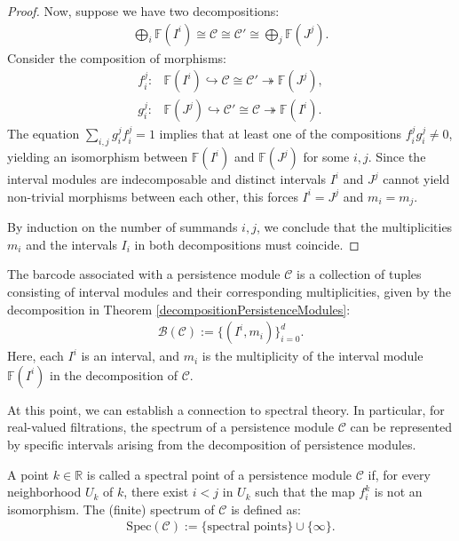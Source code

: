 \begin{proof}
Now, suppose we have two decompositions:
\begin{align}
	\bigoplus_i \mathbb{F}(I^i) \cong \mathcal{C} \cong \mathcal{C}' \cong \bigoplus_j \mathbb{F}(J^j).
\end{align}
Consider the composition of morphisms:
\begin{align}
	f_{i}^j: &\mathbb{F}(I^i) \hookrightarrow \mathcal{C} \cong \mathcal{C}' \twoheadrightarrow \mathbb{F}(J^j),\\
	g_{i}^j: &\mathbb{F}(J^j) \hookrightarrow \mathcal{C}' \cong \mathcal{C} \twoheadrightarrow \mathbb{F}(I^i).
\end{align}
The equation $\sum_{i,j} g_{i}^jf_{i}^j = 1$ implies that at least one of the compositions $f_{i}^jg_{i}^j \neq 0$, yielding an isomorphism between $\mathbb{F}(I^i)$ and $\mathbb{F}(J^j)$ for some $i, j$. Since the interval modules are indecomposable and distinct intervals $I^i$ and $J^j$ cannot yield non-trivial morphisms between each other, this forces $I^i = J^j$ and $m_i = m_j$. 

By induction on the number of summands $i,j$, we conclude that the multiplicities $m_i$ and the intervals $I_i$ in both decompositions must coincide.
\end{proof}

\begin{definition}
The barcode associated with a persistence module $\mathcal{C}$ is a collection of tuples consisting of interval modules and their corresponding multiplicities, given by the decomposition in Theorem \ref{decompositionPersistenceModules}:
\begin{align}
	\mathcal{B}(\mathcal{C}) := \{(I^i, m_i)\}_{i=0}^d.
\end{align}
Here, each $I^i$ is an interval, and $m_i$ is the multiplicity of the interval module $\mathbb{F}(I^i)$ in the decomposition of $\mathcal{C}$.
\end{definition}

At this point, we can establish a connection to spectral theory. In particular, for real-valued filtrations, the spectrum of a persistence module $\mathcal{C}$ can be represented by specific intervals arising from the decomposition of persistence modules.

\begin{definition}[Spectrum]
A point $k \in \mathbb{R}$ is called a spectral point of a persistence module $\mathcal{C}$ if, for every neighborhood $U_k$ of $k$, there exist $i < j$ in $U_k$ such that the map $f_{i}^k$ is not an isomorphism. The (finite) spectrum of $\mathcal{C}$ is defined as:
\begin{align}
	\text{Spec}(\mathcal{C}) := \{ \text{spectral points} \} \cup \{\infty\}.
\end{align}
\end{definition}

